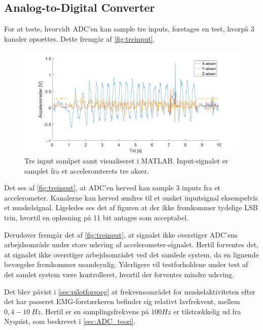 \subsection{Analog-to-Digital Converter}

For at teste, hvorvidt ADC'en kan sample tre inputs, foretages en test, hvorpå 3 kanaler opsættes. Dette fremgår af \autoref{fig:treinput}.

\begin{figure}[H]
\centering
\includegraphics[width=1\textwidth]{figures/treinput}
\caption{Tre input samlpet samt visualiseret i MATLAB. Input-signalet er samplet fra et acceleromterets tre akser.}
\label{fig:treinput}
\end{figure}

\noindent
Det ses af \autoref{fig:treinput}, at ADC'en herved kan sample 3 inputs fra et accelerometer. Kanalerne kan herved ændres til et ønsket inputsignal eksempelvis et muskelsignal. Ligeledes ses det af figuren at der ikke fremkommer tydelige LSB trin, hvortil en opløsning på 11 bit antages som acceptabel.

Derudover fremgår det af \autoref{fig:treinput}, at signalet ikke overstiger ADC'ens arbejdsområde under store udsving af accelerometer-signalet. Hertil forventes det, at signalet ikke overstiger arbejdsområdet ved det samlede system, da en lignende bevægelse fremkommer usandsynlig. Yderligere vil testforholdene under test af det samlet system være kontrolleret, hvortil der forventes mindre udsving.

Det blev påvist i \autoref{sec:pilotforsoeg} at frekvensområdet for muskelaktiviteten efter det har passeret EMG-forstærkeren befinder sig relativt lavfrekvent, mellem $0,4-10~Hz$. Hertil er en samplingsfrekvens på $100Hz$ er tilstrækkelig ud fra Nyquist, som beskrevet i \autoref{sec:ADC_teori}.

